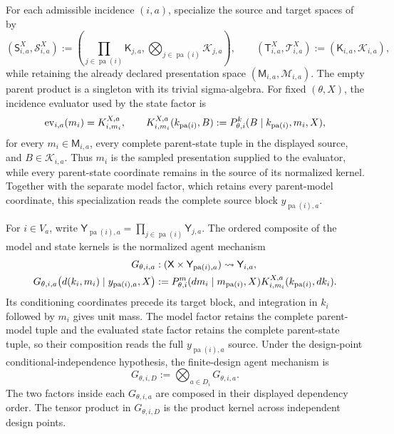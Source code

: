For each admissible incidence $(i,a)$, specialize the source and target
spaces of  by
\[
(\mathsf S_{i,a}^X,\mathscr S_{i,a}^X)
:=\left(
\prod_{j\in\operatorname{pa}(i)}\mathsf K_{j,a},
\bigotimes_{j\in\operatorname{pa}(i)}\mathscr K_{j,a}
\right),
\qquad
(\mathsf T_{i,a}^X,\mathscr T_{i,a}^X)
:=(\mathsf K_{i,a},\mathscr K_{i,a}),
\]
while retaining the already declared presentation space
\((\mathsf M_{i,a},\mathscr M_{i,a})\). The empty parent product is a
singleton with its trivial sigma-algebra. For fixed $(\theta,X)$, the
incidence evaluator used by the state factor is
\begin{equation}
\operatorname{ev}_{i,a}(m_i)=K^{X,a}_{i,m_i},
\qquad
K^{X,a}_{i,m_i}(k_{\operatorname{pa}(i)},B)
:=P_{\theta,i}^{k}(B\mid k_{\operatorname{pa}(i)},m_i,X),
\label{eq:gen-evaluated-state-kernel}
\end{equation}
for every $m_i\in\mathsf M_{i,a}$, every complete parent-state tuple in the
displayed source, and $B\in\mathscr K_{i,a}$. Thus $m_i$ is the sampled
presentation supplied to the evaluator, while every parent-state coordinate
remains in the source of its normalized kernel. Together with the separate
model factor, which retains every parent-model coordinate, this specialization
reads the complete source block \(y_{\operatorname{pa}(i),a}\).

For $i\in V_a$, write
$\mathsf Y_{\operatorname{pa}(i),a}=\prod_{j\in\operatorname{pa}(i)}\mathsf Y_{j,a}$.
The ordered composite of the model and state kernels is the normalized agent mechanism
\begin{equation}
\begin{split}
G_{\theta,i,a}&:
(\mathsf X\times\mathsf Y_{\operatorname{pa}(i),a})
\rightsquigarrow\mathsf Y_{i,a},\\
G_{\theta,i,a}\bigl(d(k_i,m_i)\mid y_{\operatorname{pa}(i),a},X\bigr)
&:=P_{\theta,i}^{m}(dm_i\mid m_{\operatorname{pa}(i)},X)
K^{X,a}_{i,m_i}(k_{\operatorname{pa}(i)},dk_i).
\end{split}
\label{eq:gen-agent-mechanism}
\end{equation}
Its conditioning coordinates precede its target block, and integration in $k_i$ followed by $m_i$
gives unit mass. The model factor retains the complete parent-model tuple and the evaluated state
factor retains the complete parent-state tuple, so their composition reads the full
$y_{\operatorname{pa}(i),a}$ source. Under the design-point conditional-independence hypothesis,
the finite-design
agent mechanism is
\begin{equation}
G_{\theta,i,D}:=\bigotimes_{a\in D_i}G_{\theta,i,a}.
\label{eq:gen-agent-design-mechanism}
\end{equation}
The two factors inside each $G_{\theta,i,a}$ are composed in their displayed dependency order.
The tensor product in $G_{\theta,i,D}$ is the product kernel across independent design points. 

